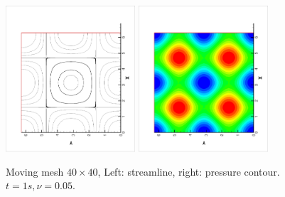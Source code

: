 \documentclass{article}
\begin{document}
 \begin{figure}[ht]
   \centering
   \includegraphics[width = 0.43\textwidth, angle = -90]{./moving40_streamline.eps}
   \includegraphics[width = 0.43\textwidth, angle = -90]{./moving40_pressure.eps}
   \caption{\small Moving mesh $40 \times 40$, Left: streamline, right: pressure
     contour. $t = 1s, \nu = 0.05$.}
   \label{fig::moving40_solution}
 \end{figure}
\end{document}
